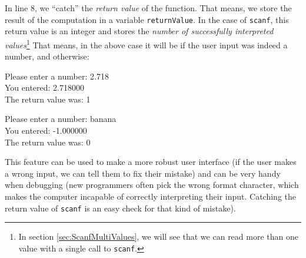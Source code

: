 In line 8, we \enquote{catch} the \emph{return value} of the function. That means, we store the result of the computation in a variable \texttt{returnValue}. In the case of \texttt{scanf}, this return value is an integer and stores the \emph{number of successfully interpreted values}\footnote{In section \ref{sec:ScanfMultiValues}, we will see that we can read more than one value with a single call to \texttt{scanf}.} That means, in the above case it will be  if the user input was indeed a number, and  otherwise:

\begin{tcbraster}[raster columns=2,
                  raster equal height,
                  nobeforeafter,
                  raster column skip=0.2cm]
\begin{cmdbox}
Please enter a number: 2.718 \\
You entered: 2.718000 \\
The return value was: 1
\end{cmdbox}
%
\begin{cmdbox}
Please enter a number: banana \\
You entered: -1.000000 \\
The return value was: 0
\end{cmdbox}
\end{tcbraster}

This feature can be used to make a more robust user interface (if the user makes a wrong input, we can tell them to fix their mistake) and can be very handy when debugging (new programmers often pick the wrong format character, which makes the computer incapable of correctly interpreting their input. Catching the return value of \texttt{scanf} is an easy check for that kind of mistake).

